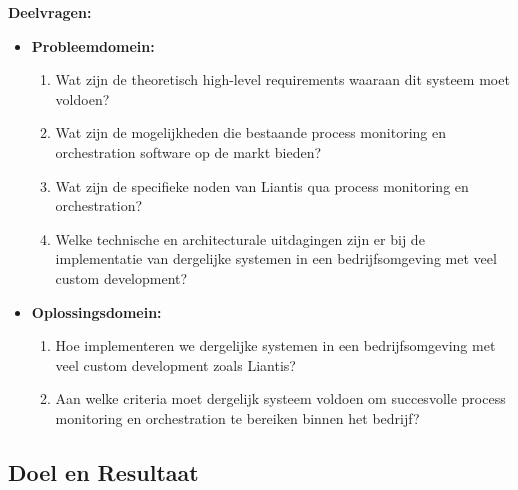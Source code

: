 \textbf{Deelvragen:}
\begin{itemize}
    \item \textbf{Probleemdomein:}
    \begin{enumerate}
        \item Wat zijn de theoretisch high-level requirements waaraan dit systeem moet voldoen?
        \item Wat zijn de mogelijkheden die bestaande process monitoring en orchestration software op de markt bieden?
        \item Wat zijn de specifieke noden van Liantis qua process monitoring en orchestration?
        \item Welke technische en architecturale uitdagingen zijn er bij de implementatie van dergelijke systemen in een bedrijfsomgeving met veel custom development?
    \end{enumerate}
    
    \item \textbf{Oplossingsdomein:}
    \begin{enumerate}
        \item Hoe implementeren we dergelijke systemen in een bedrijfsomgeving met veel custom development zoals Liantis?
        \item Aan welke criteria moet dergelijk systeem voldoen om succesvolle process monitoring en orchestration te bereiken binnen het bedrijf?
    \end{enumerate}
\end{itemize}

\subsection{Doel en Resultaat}


